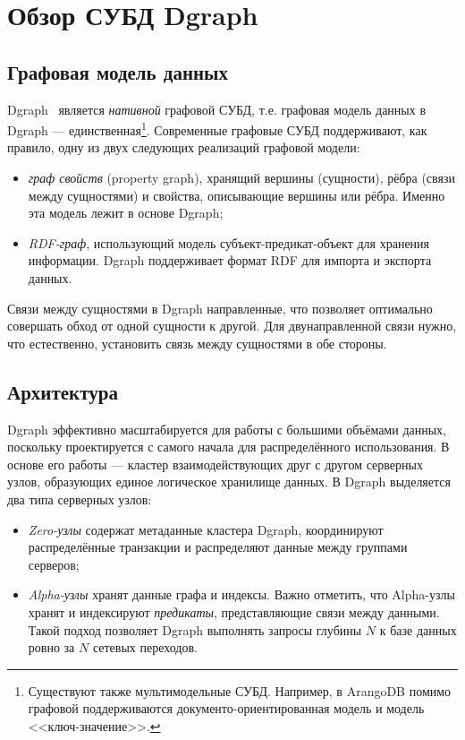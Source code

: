 \section {Обзор СУБД Dgraph}

\subsection{Графовая модель данных}

Dgraph~\cite{dgraph} является \textit{нативной} графовой СУБД, т.е. графовая модель данных в Dgraph ---
единственная\footnote{Существуют также мультимодельные СУБД. Например, в ArangoDB помимо графовой поддерживаются
документо-ориентированная модель и модель <<ключ-значение>>.}. Современные графовые СУБД поддерживают, как правило, одну
из двух следующих реализаций графовой модели:
\begin{itemize}
  \item \textit{граф свойств} (property graph), хранящий вершины (сущности), рёбра (связи между сущностями) и свойства,
    описывающие вершины или рёбра. Именно эта модель лежит в основе Dgraph;
  \item \textit{RDF-граф}, использующий модель субъект-предикат-объект для хранения информации. Dgraph поддерживает
    формат RDF для импорта и экспорта данных.
\end{itemize}

Связи между сущностями в Dgraph направленные, что позволяет оптимально совершать обход от одной сущности к другой. Для
двунаправленной связи нужно, что естественно, установить связь между сущностями в обе стороны.

\subsection{Архитектура}

Dgraph эффективно масштабируется для работы с большими объёмами данных, поскольку проектируется с самого начала для
распределённого использования. В основе его работы --- кластер взаимодействующих друг с другом серверных узлов,
образующих единое логическое хранилище данных. В Dgraph выделяется два типа серверных узлов:
\begin{itemize}
  \item \textit{Zero-узлы} содержат метаданные кластера Dgraph, координируют распределённые транзакции и распределяют
    данные между группами серверов;
  \item \textit{Alpha-узлы} хранят данные графа и индексы. Важно отметить, что Alpha-узлы хранят и индексируют
    \textit{предикаты}, представляющие связи между данными. Такой подход позволяет Dgraph выполнять запросы глубины $N$
    к базе данных ровно за $N$ сетевых переходов.
\end{itemize}

